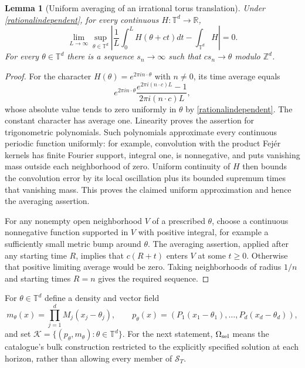 \documentclass[11pt]{article}
\newtheorem{lemma}[theorem]{Lemma}
\newcommand{\R}{\mathbb R}
\newcommand{\Z}{\mathbb Z}
\newcommand{\T}{\mathbb T}
\begin{document}
\begin{lemma}[Uniform averaging of an irrational torus translation]
\label{torusaverage}
Under \eqref{rationalindependent}, for every continuous
$H:\T^d\to\R$,
\[
 \lim_{L\to\infty}\sup_{\theta\in\T^d}
 \left|\frac1L\int_0^L H(\theta+ct)dt-\int_{\T^d}H\right|=0.
\]
For every $\theta\in\T^d$ there is a sequence $s_n\to\infty$
such that $cs_n\to\theta$ modulo $\Z^d$.
\end{lemma}
\begin{proof}
For the character $H(\theta)=e^{2\pi i n\cdot\theta}$ with $n\ne0$,
its time average equals
\[
 e^{2\pi i n\cdot\theta}
 \frac{e^{2\pi i(n\cdot c)L}-1}{2\pi i(n\cdot c)L},
\]
whose absolute value tends to zero uniformly in $\theta$ by
\eqref{rationalindependent}. The constant character has average one.
Linearity proves the assertion for trigonometric polynomials. Such
polynomials approximate every continuous periodic function uniformly:
for example, convolution with the product Fej\'er kernels has finite
Fourier support, integral one, is nonnegative, and puts vanishing mass
outside each neighborhood of zero. Uniform continuity of $H$ then
bounds the convolution error by its local oscillation plus its bounded
supremum times that vanishing mass. This proves the claimed uniform
approximation and hence the averaging assertion.

For any nonempty open neighborhood $V$ of a prescribed $\theta$,
choose a continuous nonnegative function supported in $V$ with positive
integral, for example a sufficiently small metric bump around $\theta$.
The averaging assertion, applied after any starting time $R$, implies
that $c(R+t)$ enters $V$ at some $t\geq0$. Otherwise that positive
limiting average would be zero. Taking neighborhoods of radius $1/n$
and starting times $R=n$ gives the required sequence.
\end{proof}

For $\theta\in\T^d$ define a density and vector field
\[
 m_\theta(x)=\prod_{j=1}^dM_j(x_j-\theta_j),\qquad
 p_\theta(x)=(P_1(x_1-\theta_1),\ldots,P_d(x_d-\theta_d)),
\]
and set $\mathcal K=\{(p_\theta,m_\theta):\theta\in\T^d\}$.
For the next statement, $\Omega_{\rm sel}$ means the catalogue's bulk
construction restricted to the explicitly specified solution at each
horizon, rather than allowing every member of $\mathcal S_T$.
\end{document}
